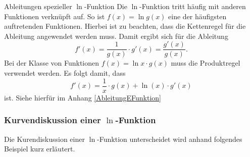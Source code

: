\begin{satz}{Ableitungen spezieller $\ln$-Funktion}{}
Die $\ln$-Funktion tritt häufig mit anderen Funktionen verknüpft auf. So ist $f(x) = \ln{g(x)}$ eine der häufigsten auftretenden Funktionen. Hierbei ist zu beachten, dass die Kettenregel für die Ableitung angewendet werden muss. Damit ergibt sich für die Ableitung $$f'(x) = \dfrac{1}{ g(x)} \cdot g'(x) = \dfrac{g'(x)}{g(x)}.$$  
Bei der Klasse von Funktionen $f(x) = \ln{x} \cdot g(x)$ muss die Produktregel verwendet werden. Es folgt damit, dass
$$f'(x) = \dfrac{1}{x}\cdot g(x) +\ln{(x)} \cdot g'(x)$$ 
ist. Siehe hierfür im Anhang \ref{AbleitungEFunktion}
\end{satz}
 \subsubsection{Kurvendiskussion einer $\ln$-Funktion}
 Die Kurendiskussion einer $\ln$-Funktion unterscheidet wird anhand folgendes Beispiel kurz erläutert.
